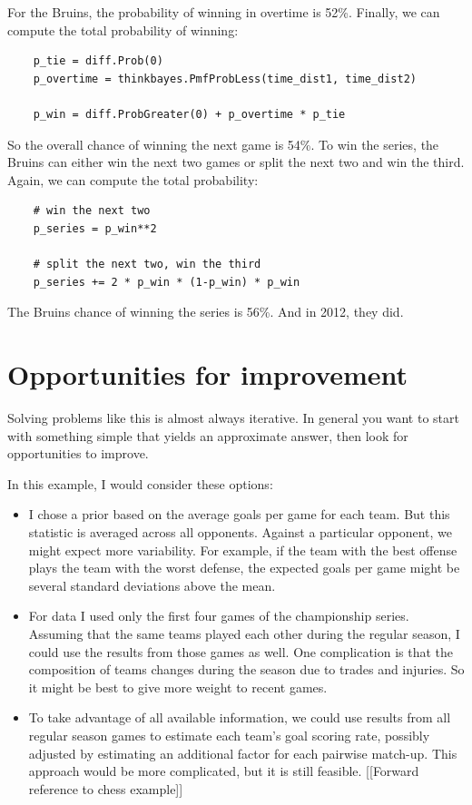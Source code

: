 \documentclass[12pt]{book}
\begin{document}
For the Bruins, the probability of winning in overtime is 52\%.
Finally, we can compute the total probability of winning:

\begin{verbatim}
    p_tie = diff.Prob(0)
    p_overtime = thinkbayes.PmfProbLess(time_dist1, time_dist2)

    p_win = diff.ProbGreater(0) + p_overtime * p_tie
\end{verbatim}  

So the overall chance of winning the next game is 54\%.
To win the series, the Bruins can either win the next two games
or split the next two and win the third.  Again, we can compute
the total probability:

\begin{verbatim}
    # win the next two
    p_series = p_win**2

    # split the next two, win the third
    p_series += 2 * p_win * (1-p_win) * p_win
\end{verbatim}  

The Bruins chance of winning the series is 56\%.  And in 2012,
they did.


\section{Opportunities for improvement}

Solving problems like this is almost always iterative.  In general
you want to start with something simple that yields an approximate
answer, then look for opportunities to improve.

In this example, I would consider these options:

\begin{itemize}

\item I chose a prior based on the average goals per game for each
  team.  But this statistic is averaged across all opponents.  Against
  a particular opponent, we might expect more variability.  For
  example, if the team with the best offense plays the team with the
  worst defense, the expected goals per game might be several standard
  deviations above the mean.

\item For data I used only the first four games of the championship
  series.  Assuming that the same teams played each other during the
  regular season, I could use the results from those games as well.
  One complication is that the composition of teams changes during
  the season due to trades and injuries.  So it might be best to
  give more weight to recent games.

\item To take advantage of all available information, we could
  use results from all regular season games to estimate each team's
  goal scoring rate, possibly adjusted by estimating
  an additional factor for each pairwise match-up.  This approach
  would be more complicated, but it is still feasible.
  [[Forward reference to chess example]]

\end{itemize}
\end{document}
